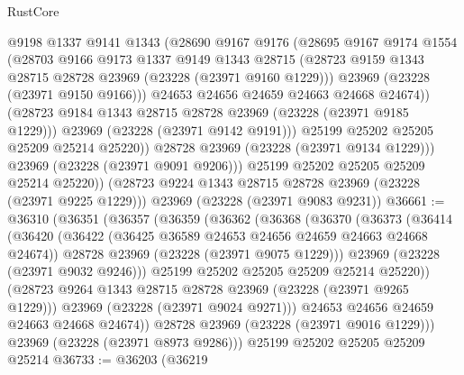 \begin{lexlean}{RustCore}
\begin{coremodule}
                  @9198
                  @1337
                  @9141
                  @1343
                  (@28690
                    @9167
                    @9176
                    (@28695
                      @9167
                      @9174
                      @1554
                      (@28703
                        @9166
                        @9173
                        @1337
                        @9149
                        @1343
                        @28715
                        (@28723 @9159 @1343 @28715 @28728 @23969 (@23228 (@23971 @9160 @1229)))
                        @23969
                        (@23228 (@23971 @9150 @9166)))
                      @24653
                      @24656
                      @24659
                      @24663
                      @24668
                      @24674))
                  (@28723 @9184 @1343 @28715 @28728 @23969 (@23228 (@23971 @9185 @1229)))
                  @23969
                  (@23228 (@23971 @9142 @9191)))
                @25199
                @25202
                @25205
                @25209
                @25214
                @25220))
            @28728
            @23969
            (@23228 (@23971 @9134 @1229)))
          @23969
          (@23228 (@23971 @9091 @9206)))
        @25199
        @25202
        @25205
        @25209
        @25214
        @25220))
    (@28723 @9224 @1343 @28715 @28728 @23969 (@23228 (@23971 @9225 @1229)))
    @23969
    (@23228 (@23971 @9083 @9231))
@36661 := @36310
    (@36351
      (@36357
        (@36359
          (@36362
            (@36368
              (@36370
                (@36373
                  (@36414
                    (@36420
                      (@36422 (@36425 @36589 @24653 @24656 @24659 @24663 @24668 @24674))
                      @28728
                      @23969
                      (@23228 (@23971 @9075 @1229)))
                    @23969
                    (@23228 (@23971 @9032 @9246)))
                  @25199
                  @25202
                  @25205
                  @25209
                  @25214
                  @25220))
              (@28723 @9264 @1343 @28715 @28728 @23969 (@23228 (@23971 @9265 @1229)))
              @23969
              (@23228 (@23971 @9024 @9271)))
            @24653
            @24656
            @24659
            @24663
            @24668
            @24674))
        @28728
        @23969
        (@23228 (@23971 @9016 @1229)))
      @23969
      (@23228 (@23971 @8973 @9286)))
    @25199
    @25202
    @25205
    @25209
    @25214
@36733 := @36203
    (@36219

\end{coremodule}
\end{lexlean}
